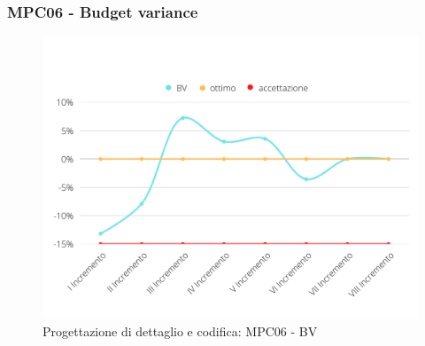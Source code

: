 \subsubsection{MPC06 - Budget variance}
\begin{figure}[H]
    \centering
    \includegraphics[scale=0.50]{Sezioni/images/pdc-BV.png}
    \caption{Progettazione di dettaglio e codifica: MPC06 - BV}
\end{figure}